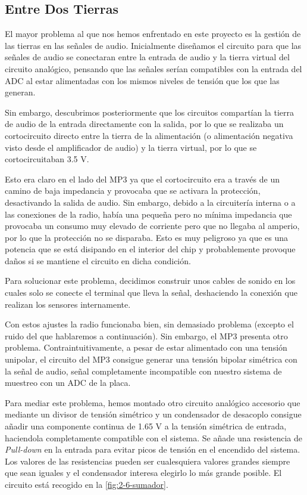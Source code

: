 \subsection{Entre Dos Tierras}

El mayor problema al que nos hemos enfrentado en este proyecto es la gestión de las tierras en las señales de audio. Inicialmente diseñamos el circuito para que las señales de audio se conectaran entre la entrada de audio y la tierra virtual del circuito analógico, pensando que las señales serían compatibles con la entrada del ADC al estar alimentadas con los mismos niveles de tensión que los que las generan.

Sin embargo, descubrimos posteriormente que los circuitos compartían la tierra de audio de la entrada directamente con la salida, por lo que se realizaba un cortocircuito directo entre la tierra de la alimentación (o alimentación negativa visto desde el amplificador de audio) y la tierra virtual, por lo que se cortocircuitaban 3.5 V. 

Esto era claro en el lado del MP3 ya que el cortocircuito era a través de un camino de baja impedancia y provocaba que se activara la protección, desactivando la salida de audio. Sin embargo, debido a la circuitería interna o a las conexiones de la radio, había una pequeña pero no mínima impedancia que provocaba un consumo muy elevado de corriente pero que no llegaba al amperio, por lo que la protección no se disparaba. Esto es muy peligroso ya que es una potencia que se está disipando en el interior del chip y probablemente provoque daños si se mantiene el circuito en dicha condición.

Para solucionar este problema, decidimos construir unos cables de sonido en los cuales solo se conecte el terminal que lleva la señal, deshaciendo la conexión que realizan los sensores internamente.

Con estos ajustes la radio funcionaba bien, sin demasiado problema (excepto el ruido del que hablaremos a continuación). Sin embargo, el MP3 presenta otro problema. Contraintuitivamente, a pesar de estar alimentado con una tensión unipolar, el circuito del MP3 consigue generar una tensión bipolar simétrica con la señal de audio, señal completamente incompatible con nuestro sistema de muestreo con un ADC de la placa.

Para mediar este problema, hemos montado otro circuito analógico accesorio que mediante un divisor de tensión simétrico y un condensador de desacoplo consigue añadir una componente continua de 1.65 V a la tensión simétrica de entrada, haciendola completamente compatible con el sistema. Se añade una resistencia de \textit{Pull-down} en la entrada para evitar picos de tensión en el encendido del sistema. Los valores de las resistencias pueden ser cualesquiera valores grandes siempre que sean iguales y el condensador interesa elegirlo lo más grande posible. El circuito está recogido en la \autoref{fig:2-6-sumador}. 

